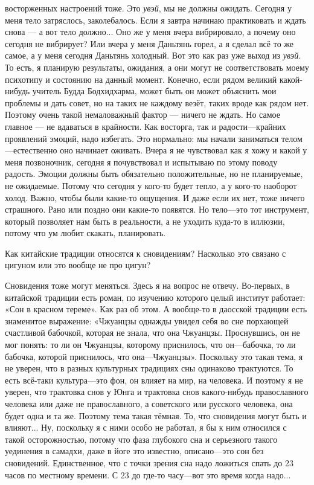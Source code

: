 восторженных настроений тоже.\hfil\break
\indent
Это {\it увэй}, мы не должны ожидать. Сегодня у меня тело затряслось,
заколебалось. Если я завтра
начинаю практиковать и ждать снова --- а вот тело должно... Оно же у меня вчера вибрировало, а
почему оно сегодня не
вибрирует? Или вчера у меня Даньтянь горел, а я сделал всё то же самое, а у меня сегодня
Даньтянь холодный.
Вот это
как раз уже выход из {\it увэй}. То есть, я планирую результаты, ожидания, а они могут не
соответствовать моему
психотипу и состоянию на данный момент. Конечно, если рядом великий какой-нибудь учитель
Будда Бодхидхарма,
может быть он может объяснить мои проблемы и дать совет, но на таких не каждому везёт, таких вроде
как рядом нет. Поэтому
очень такой немаловажный фактор --- ничего не ждать.
Но самое главное --- не вдаваться в крайности.
Как восторга, так и радости---крайних проявлений эмоций, надо избегать.\hfil\break
\indent
Это нормально: мы начали
заниматься телом---естественно
оно начинает оживать. Вчера я не чувствовал как я хожу и какой у меня позвоночник, сегодня я
почувствовал и испытываю по
этому поводу радость. Эмоции должны быть обязательно положительные, но не планируемые, не
ожидаемые. Потому
что сегодня у кого-то будет тепло, а у кого-то наоборот холод.
Важно, чтобы были какие-то ощущения. И даже если их нет, тоже ничего страшного. Рано или
поздно они какие-то
появятся. Но тело---это тот инструмент, который позволяет нам быть в реальности, а не уходить
куда-то в иллюзии,
потому что ум любит скакать, планировать.

\A
Как китайские традиции относятся к сновидениям?
Насколько это связано с цигуном или это вообще не про цигун?

\T
Сновидения тоже могут меняться. Здесь я на вопрос не отвечу. Во-первых, в китайской
традиции есть роман, по
изучению которого целый институт работает: «Сон в красном тереме». Как раз об
этом.\hfil\break
\indent
А вообще-то в
даосской традиции есть знаменитое выражение: «Чжуанцзы однажды увидел себя во сне порхающей
счастливой бабочкой, которая не знала, что она Чжуанцзы. Проснувшись, он не мог понять: то ли он
Чжуанцзы, которому приснилось, что он---бабочка, то ли бабочка, которой приснилось, что
она---Чжуанцзы».\hfil\break
\indent
Поскольку это такая тема, я не уверен, что в разных культурных
традициях сны одинаково
трактуются. То есть всё-таки культура---это фон, он влияет на мир, на человека. И поэтому я не
уверен, что трактовка
снов у Юнга и трактовка снов какого-нибудь православного человека или даже не
православного, а советского или русского человека, она будет одна и та же.\hfil\break
\indent
Поэтому тема такая тёмная. То, что сновидения могут быть и влияют... Ну, поскольку я с ними особо
не работал, я бы к ним
относился с такой осторожностью, потому что фаза глубокого сна и серьезного
такого уединения в самадхи,
даже в йоге это известно, описано---это сон без сновидений.
Единственное, что с точки зрения сна надо ложиться спать до 23 часов по местному времени.
С 23 до где-то часу---вот это время когда надо...


